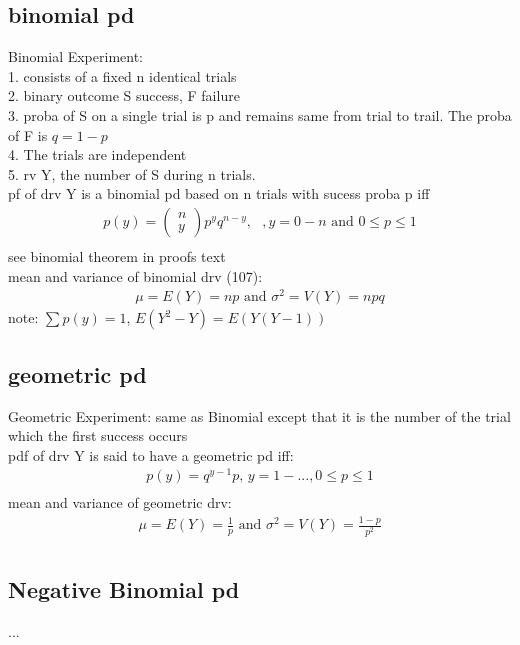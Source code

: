 \documentclass[12pt]{article}
\begin{document}
	\subsection{binomial pd}
		Binomial Experiment: \\
		1. consists of a fixed n identical trials \\
		2. binary outcome S success, F failure \\
		3. proba of S on a single trial is p and remains same from trial to trail.
		The proba of F is $ q = 1 - p $ \\
		4. The trials are independent \\
		5. rv Y, the number of S during n trials. \\
		pf of drv Y is a binomial pd based on n trials with sucess proba p iff
		\begin{align*}
			p(y) = \begin{pmatrix} n \\ y \end{pmatrix} 
			p^y q^{n-y}, \text{    }, y = 0-n \text{ and } 0 \le p \le 1 \\
		\end{align*}
		see binomial theorem in proofs text \\
		mean and variance of binomial drv (107):
		\begin{align*}
			\mu = E(Y) = np \text{ and } \sigma^2 = V(Y) = npq
		\end{align*}
		note: $ \sum p(y) = 1 $, $ E(Y^2-Y) = E(Y(Y-1)) $
	\subsection{geometric pd}
		Geometric Experiment:
		same as Binomial except that it is the number of the trial which
		the first success occurs \\
		pdf of drv Y is said to have a geometric pd iff:
		\begin{align*}
			p(y) = q^{y-1}p \text{,   } y = 1-..., 0 \le p \le 1 \\
		\end{align*}
		mean and variance of geometric drv:
		\begin{align*}
			\mu = E(Y) = \frac{1}{p} \text{ and } \sigma^2 = V(Y) = \frac{1-p}{p^2} \\
		\end{align*}
	\subsection{Negative Binomial pd}
		...
\end{document}
